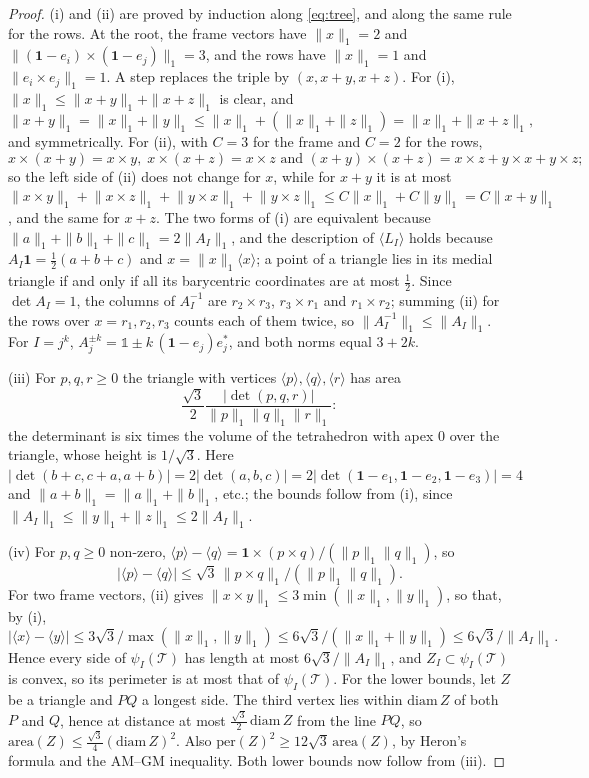 \documentclass[11pt]{amsart}
\newcommand{\id}{\mathds{1}}
\theoremstyle{definition}
\theoremstyle{remark}
\newcommand{\one}{\mathbf 1}
\newcommand{\cT}{\mathcal T}
\newcommand{\abs}[1]{\lvert #1\rvert}
\newcommand{\norm}[1]{\lVert #1\rVert}
\newcommand{\pr}[1]{\langle #1\rangle}
\begin{document}
\begin{proof}
    (i) and (ii) are proved by induction along \eqref{eq:tree}, and along the same rule for the rows.
    At the root, the frame vectors have $\|x\|_1=2$ and $\norm{(\one-e_i)\times(\one-e_j)}_1=3$, and the rows have $\|x\|_1=1$ and $\norm{e_i\times e_j}_1=1$. A step replaces the triple by $(x,x+y,x+z)$.
    For (i), $\|x\|_1\le \|x+y\|_1+\|x+z\|_1$ is clear, and
\[
\|x+y\|_1=\|x\|_1+\|y\|_1\le \|x\|_1+(\|x\|_1+\|z\|_1)=\|x\|_1+\|x+z\|_1,
\]
and symmetrically.
For (ii), with $C=3$ for the frame and $C=2$ for the rows,
\[
x\times(x+y)=x\times y,\;
x\times(x+z)=x\times z\text{ and }(x+y)\times(x+z)=x\times z+y\times x+y\times z;
\]
so the left side of (ii) does not change for $x$, while for $x+y$ it is at most $\norm{x\times y}_1+\norm{x\times z}_1+\norm{y\times x}_1+\norm{y\times z}_1\le C\|x\|_1+C\|y\|_1=C\|x+y\|_1$, and the same for $x+z$.
The two forms of (i) are equivalent because $\|a\|_1+\|b\|_1+\|c\|_1=2\|A_I\|_1$, and the description of $\pr{L_I}$ holds because $A_I\one=\frac12(a+b+c)$ and $x=\|x\|_1\pr x$; a point of a triangle lies in its medial triangle if and only if all its barycentric coordinates are at most $\frac12$.
Since $\det A_I=1$, the columns of $A_I^{-1}$ are $r_2\times r_3$, $r_3\times r_1$ and $r_1\times r_2$; summing (ii) for the rows over $x=r_1,r_2,r_3$ counts each of them twice, so $\norm{A_I^{-1}}_1\le\|A_I\|_1$. For $I=j^k$, $A_j^{\pm k}=\id\pm k\,(\one-e_j)e_j^*$, and both norms equal $3+2k$.

(iii) For $p,q,r\ge0$ the triangle with vertices $\pr p,\pr q,\pr r$ has area
\[
\frac{\sqrt3}{2}\frac{\abs{\det(p,q,r)}}{\|p\|_1\|q\|_1\|r\|_1}:
\]
the determinant is six times the volume
of the tetrahedron with apex $0$ over the triangle, whose height is $1/\sqrt3$. Here
$\abs{\det(b+c,c+a,a+b)}=2\abs{\det(a,b,c)}=2\abs{\det(\one-e_1,\one-e_2,\one-e_3)}=4$ and $\|a+b\|_1=\|a\|_1+\|b\|_1$, etc.; the bounds
follow from (i), since $\|A_I\|_1\le \|y\|_1+\|z\|_1\le2\|A_I\|_1$.

    (iv) For $p,q\ge0$ non-zero, $\pr p-\pr q=\one\times(p\times q)/(\|p\|_1\|q\|_1)$, so
\[
\abs{\pr p-\pr q}\le\sqrt3\,\norm{p\times q}_1/(\|p\|_1\|q\|_1).
\]
    For two frame vectors, (ii) gives $\norm{x\times y}_1\le3\min(\|x\|_1,\|y\|_1)$, so that, by (i),
\[
\abs{\pr x-\pr y}\le3\sqrt3/\max(\|x\|_1,\|y\|_1)\le6\sqrt3/(\|x\|_1+\|y\|_1)\le6\sqrt3/\|A_I\|_1.
\]
    Hence every side of $\psi_I(\cT)$ has length at most $6\sqrt3/\|A_I\|_1$, and $Z_I\subset\psi_I(\cT)$ is convex, so its perimeter is at most that of $\psi_I(\cT)$.
For the lower bounds, let $Z$ be a triangle and $PQ$ a longest side. The third vertex lies within $\mathrm{diam}\,Z$ of both $P$ and $Q$, hence at distance at most $\frac{\sqrt3}2\,\mathrm{diam}\,Z$ from the line $PQ$, so $\mathrm{area}(Z)\le\frac{\sqrt3}4(\mathrm{diam}\,Z)^2$. Also $\mathrm{per}(Z)^2\ge12\sqrt3\,\mathrm{area}(Z)$, by Heron's formula and the AM--GM inequality. Both lower bounds now follow from (iii).


\end{proof}
\end{document}
